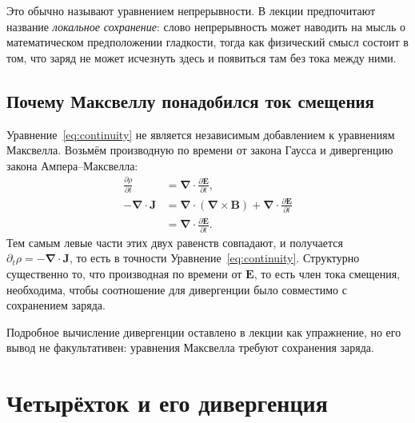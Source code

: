 Это обычно называют уравнением непрерывности. В лекции предпочитают название \emph{локальное сохранение}: слово непрерывность может наводить на мысль о математическом предположении гладкости, тогда как физический смысл состоит в том, что заряд не может исчезнуть здесь и появиться там без тока между ними.

\subsection{Почему Максвеллу понадобился ток смещения}

Уравнение~\eqref{eq:continuity} не является независимым добавлением к уравнениям Максвелла. Возьмём производную по времени от закона Гаусса и дивергенцию закона Ампера--Максвелла:
\begin{align}
\frac{\partial\rho}{\partial t}
&=
\boldsymbol\nabla\cdot
\frac{\partial\mathbf E}{\partial t},
\\
-\boldsymbol\nabla\cdot\mathbf J
&=
\boldsymbol\nabla\cdot
(\boldsymbol\nabla\times\mathbf B)
+
\boldsymbol\nabla\cdot
\frac{\partial\mathbf E}{\partial t}
\\
&=
\boldsymbol\nabla\cdot
\frac{\partial\mathbf E}{\partial t}.
\end{align}
Тем самым левые части этих двух равенств совпадают, и получается
\(\partial_t\rho=-\boldsymbol\nabla\cdot\mathbf J\), то есть в точности
Уравнение~\eqref{eq:continuity}. Структурно существенно то, что производная по времени от \(\mathbf E\), то есть член тока смещения, необходима, чтобы соотношение для дивергенции было совместимо с сохранением заряда.

\begin{classroomqa}
\end{classroomqa}

Подробное вычисление дивергенции оставлено в лекции как упражнение, но его вывод не факультативен: уравнения Максвелла требуют сохранения заряда.

\section{Четырёхток и его дивергенция}


